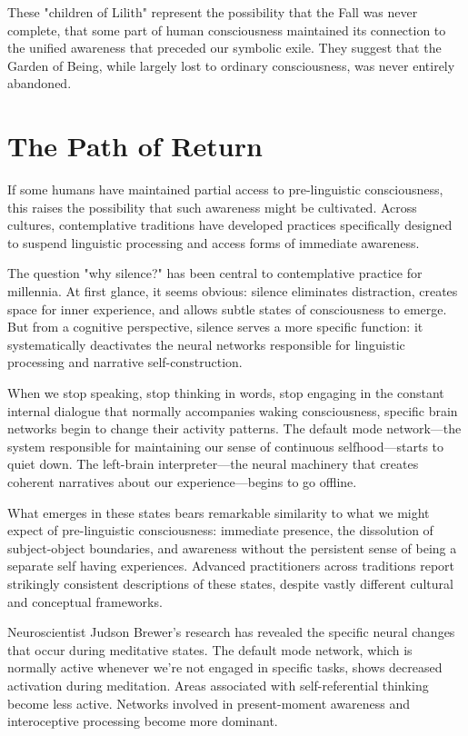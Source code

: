 These "children of Lilith" represent the possibility that the Fall was never complete, that some part of human consciousness maintained its connection to the unified awareness that preceded our symbolic exile. They suggest that the Garden of Being, while largely lost to ordinary consciousness, was never entirely abandoned.

\section{The Path of Return}

If some humans have maintained partial access to pre-linguistic consciousness, this raises the possibility that such awareness might be cultivated. Across cultures, contemplative traditions have developed practices specifically designed to suspend linguistic processing and access forms of immediate awareness.

The question "why silence?" has been central to contemplative practice for millennia. At first glance, it seems obvious: silence eliminates distraction, creates space for inner experience, and allows subtle states of consciousness to emerge. But from a cognitive perspective, silence serves a more specific function: it systematically deactivates the neural networks responsible for linguistic processing and narrative self-construction.

When we stop speaking, stop thinking in words, stop engaging in the constant internal dialogue that normally accompanies waking consciousness, specific brain networks begin to change their activity patterns. The default mode network—the system responsible for maintaining our sense of continuous selfhood—starts to quiet down. The left-brain interpreter—the neural machinery that creates coherent narratives about our experience—begins to go offline.

What emerges in these states bears remarkable similarity to what we might expect of pre-linguistic consciousness: immediate presence, the dissolution of subject-object boundaries, and awareness without the persistent sense of being a separate self having experiences. Advanced practitioners across traditions report strikingly consistent descriptions of these states, despite vastly different cultural and conceptual frameworks.

Neuroscientist Judson Brewer's research has revealed the specific neural changes that occur during meditative states. The default mode network, which is normally active whenever we're not engaged in specific tasks, shows decreased activation during meditation. Areas associated with self-referential thinking become less active. Networks involved in present-moment awareness and interoceptive processing become more dominant.

